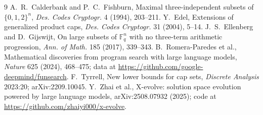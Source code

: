\documentclass[11pt]{article}
\numberwithin{equation}{section}
\theoremstyle{definition}
\theoremstyle{remark}
\newcommand{\F}{\mathbb F}
\begin{document}
\begin{thebibliography}{9}
 A.~R.~Calderbank and P.~C.~Fishburn, Maximal three-independent subsets of $\{0,1,2\}^n$,
\emph{Des. Codes Cryptogr.} 4 (1994), 203--211.
 Y.~Edel, Extensions of generalized product caps, \emph{Des. Codes Cryptogr.} 31 (2004), 5--14.
 J.~S.~Ellenberg and D.~Gijswijt, On large subsets of $\F_q^n$ with no three-term arithmetic
progression, \emph{Ann. of Math.} 185 (2017), 339--343.
 B.~Romera-Paredes et al., Mathematical discoveries from program search with large
language models, \emph{Nature} 625 (2024), 468--475; data at
\url{https://github.com/google-deepmind/funsearch}.
 F.~Tyrrell, New lower bounds for cap sets, \emph{Discrete Analysis} 2023:20;
arXiv:2209.10045.
 Y.~Zhai et al., X-evolve: solution space evolution powered by large language models,
arXiv:2508.07932 (2025); code at \url{https://github.com/zhaiyi000/x-evolve}.
\end{thebibliography}
\end{document}

